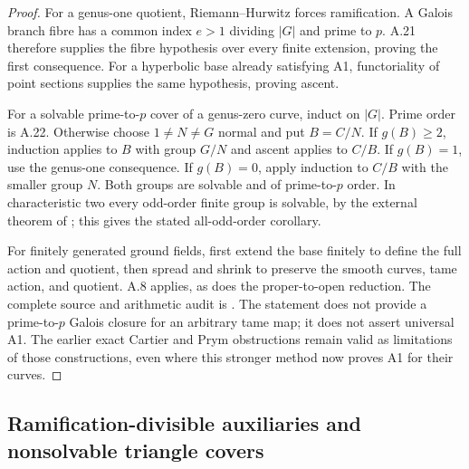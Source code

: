 \begin{proof}
For a genus-one quotient, Riemann--Hurwitz forces
ramification. A Galois branch fibre has a common
index $e>1$ dividing $|G|$ and prime to $p$.
A.21 therefore supplies the fibre hypothesis over
every finite extension, proving the first consequence.
For a hyperbolic base already satisfying A1,
functoriality of point sections supplies the same
hypothesis, proving ascent.

For a solvable prime-to-$p$ cover of a genus-zero
curve, induct on $|G|$. Prime order is A.22.
Otherwise choose $1\ne N\ne G$ normal and put
$B=C/N$. If $g(B)\ge2$, induction applies to
$B$ with group $G/N$ and ascent applies to $C/B$.
If $g(B)=1$, use the genus-one consequence.
If $g(B)=0$, apply induction to $C/B$ with the
smaller group $N$. Both groups are solvable and
of prime-to-$p$ order. In characteristic two
every odd-order finite group is solvable, by
the external theorem of \citet[Chapter I, p.~775]
{A_FeitThompson1963}; this gives the stated
all-odd-order corollary.

For finitely generated ground fields, first extend
the base finitely to define the full action and
quotient, then spread and shrink to preserve the
smooth curves, tame action, and quotient. A.8
applies, as does the proper-to-open reduction.
The complete source and arithmetic audit is
.
The statement does not provide a prime-to-$p$
Galois closure for an arbitrary tame map; it does
not assert universal A1. The earlier exact
Cartier and Prym obstructions remain valid as
limitations of those constructions, even where
this stronger method now proves A1 for their curves.
\end{proof}

\subsection{Ramification-divisible auxiliaries and nonsolvable triangle covers}

